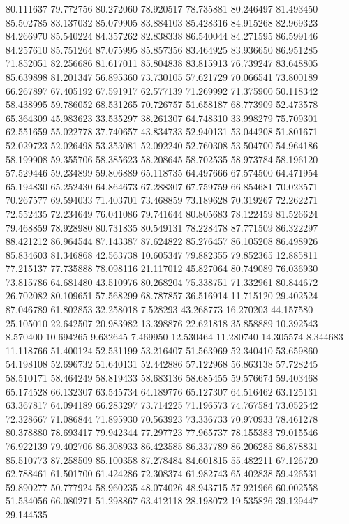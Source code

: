 80.111637
79.772756
80.272060
78.920517
78.735881
80.246497
81.493450
85.502785
83.137032
85.079905
83.884103
85.428316
84.915268
82.969323
84.266970
85.540224
84.357262
82.838338
86.540044
84.271595
86.599146
84.257610
85.751264
87.075995
85.857356
83.464925
83.936650
86.951285
71.852051
82.256686
81.617011
85.804838
83.815913
76.739247
83.648805
85.639898
81.201347
56.895360
73.730105
57.621729
70.066541
73.800189
66.267897
67.405192
67.591917
62.577139
71.269992
71.375900
50.118342
58.438995
59.786052
68.531265
70.726757
51.658187
68.773909
52.473578
65.364309
45.983623
33.535297
38.261307
64.748310
33.998279
75.709301
62.551659
55.022778
37.740657
43.834733
52.940131
53.044208
51.801671
52.029723
52.026498
53.353081
52.092240
52.760308
53.504700
54.964186
58.199908
59.355706
58.385623
58.208645
58.702535
58.973784
58.196120
57.529446
59.234899
59.806889
65.118735
64.497666
67.574500
64.471954
65.194830
65.252430
64.864673
67.288307
67.759759
66.854681
70.023571
70.267577
69.594033
71.403701
73.468859
73.189628
70.319267
72.262271
72.552435
72.234649
76.041086
79.741644
80.805683
78.122459
81.526624
79.468859
78.928980
80.731835
80.549131
78.228478
87.771509
86.322297
88.421212
86.964544
87.143387
87.624822
85.276457
86.105208
86.498926
85.834603
81.346868
42.563738
10.605347
79.882355
79.852365
12.885811
77.215137
77.735888
78.098116
21.117012
45.827064
80.749089
76.036930
73.815786
64.681480
43.510976
80.268204
75.338751
71.332961
80.844672
26.702082
80.109651
57.568299
68.787857
36.516914
11.715120
29.402524
87.046789
61.802853
32.258018
7.528293
43.268773
16.270203
44.157580
25.105010
22.642507
20.983982
13.398876
22.621818
35.858889
10.392543
8.570400
10.694265
9.632645
7.469950
12.530464
11.280740
14.305574
8.344683
11.118766
51.400124
52.531199
53.216407
51.563969
52.340410
53.659860
54.198108
52.696732
51.640131
52.442886
57.122968
56.863138
57.728245
58.510171
58.464249
58.819433
58.683136
58.685455
59.576674
59.403468
65.174528
66.132307
63.545734
64.189776
65.127307
64.516462
63.125131
63.367817
64.094189
66.283297
73.714225
71.196573
74.767584
73.052542
72.328667
71.086844
71.895930
70.563923
73.336733
70.970933
78.461278
80.378880
78.693417
79.942344
77.297723
77.965737
78.155383
79.015546
76.922139
79.402706
86.308933
86.423585
86.337789
86.206285
86.878831
85.510773
87.258509
85.100358
87.278484
84.601815
55.482211
67.126720
62.788461
61.501700
61.424286
72.308374
61.982743
65.402838
59.426531
59.890277
50.777924
58.960235
48.074026
48.943715
57.921966
60.002558
51.534056
66.080271
51.298867
63.412118
28.198072
19.535826
39.129447
29.144535
